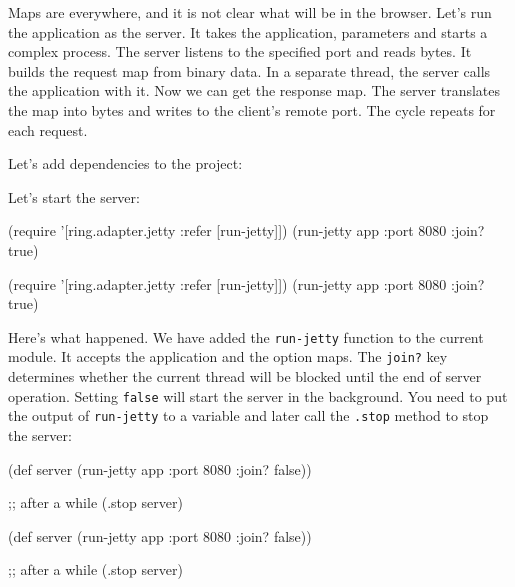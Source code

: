 \fi


Maps are everywhere, and it is not clear what will be in the browser. Let's run the application as the server. It takes the application, parameters and starts a complex process. The server listens to the specified port and reads bytes. It builds the request map from binary data. In a separate thread, the server calls the application with it. Now we can get the response map. The server translates the map into bytes and writes to the client's remote port. The cycle repeats for each request.


Let's add dependencies to the project:

\begin{clojure}
\end{clojure}

Let's start the server:

\ifx\DEVICETYPE\MOBILE

\begin{clojure}
(require '[ring.adapter.jetty
           :refer [run-jetty]])
(run-jetty app {:port 8080 :join? true})
\end{clojure}

\else

\begin{clojure}
(require '[ring.adapter.jetty :refer [run-jetty]])
(run-jetty app {:port 8080 :join? true})
\end{clojure}

\fi

Here's what happened. We have added the \verb|run-jetty| function to the current module. It accepts the application and the option maps. The \verb|join?| key determines whether the current thread will be blocked until the end of server operation. Setting \verb|false| will start the server in the background. You need to put the output of \verb|run-jetty| to a variable and later call the \verb|.stop| method to stop the server:

\ifx\DEVICETYPE\MOBILE

\begin{clojure}
(def server
  (run-jetty app {:port 8080
                  :join? false}))

;; after a while
(.stop server)
\end{clojure}

\else

\begin{clojure}
(def server
  (run-jetty app {:port 8080 :join? false}))

;; after a while
(.stop server)
\end{clojure}

